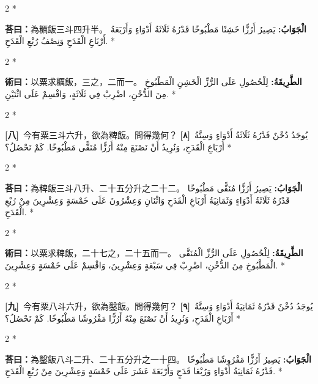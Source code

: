 \documentclass[11pt,a4paper]{article}
\newcommand{\ar}[1]{\arabicfont\beginR #1\endR}
\newcommand{\problemnum}[1]{\textbf{[\ignorespaces#1\unskip]}}
\newenvironment{bilingual}{%
  \begin{paracol}{2}%
  \switchcolumn[0]*%
}{%
  \end{paracol}%
}
\newcommand{\cnline}[1]{\switchcolumn[0]\noindent #1 \switchcolumn[1]}
\newcommand{\arline}[1]{\noindent\ar{#1} \switchcolumn[0]*}
\newenvironment{prob bilingual}{%
  \begin{paracol}{2}%
  \switchcolumn[0]*%
}{%
  \end{paracol}%
  \vspace{0.3em}%
}
\begin{document}
\begin{bilingual}
\cnline{\textcolor{answercolor}{\textbf{荅曰：}}為糲飯三斗四升半。}
\arline{\textcolor{answercolor}{\textbf{الْجَوَابُ:}} يَصِيرُ أَرُزًّا خَشِنًا مَطْبُوخًا قَدْرُهُ ثَلَاثَةُ أَدْوَاءٍ وَأَرْبَعَةُ أَرْبَاعِ الْقَدَحِ وَنِصْفُ رُبْعِ الْقَدَحِ.}
\end{bilingual}

\begin{bilingual}
\cnline{%
\textcolor{methodcolor}{\textbf{術曰：}}以粟求糲飯，三之，二而一。
}
\arline{%
\textcolor{methodcolor}{\textbf{الطَّرِيقَةُ:}} لِلْحُصُولِ عَلَى الرُّزِّ الْخَشِنِ الْمَطْبُوخِ مِنَ الدُّخْنِ، اضْرِبْ فِي ثَلَاثَةٍ، وَاقْسِمْ عَلَى اثْنَيْنِ.
}
\end{bilingual}

\begin{bilingual}
\cnline{\problemnum{八}\, 今有粟三斗六升，欲為粺飯。問得幾何？}
\arline{\problemnum{٨}\, يُوجَدُ دُخْنٌ قَدْرُهُ ثَلَاثَةُ أَدْوَاءٍ وَسِتَّةُ أَرْبَاعِ الْقَدَحِ، وَنُرِيدُ أَنْ نَصْنَعَ مِنْهُ أَرُزًّا مُنَقًّى مَطْبُوخًا. كَمْ نَحْصُلُ؟}
\end{bilingual}

\begin{bilingual}
\cnline{\textcolor{answercolor}{\textbf{荅曰：}}為粺飯三斗八升、二十五分升之二十二。}
\arline{\textcolor{answercolor}{\textbf{الْجَوَابُ:}} يَصِيرُ أَرُزًّا مُنَقًّى مَطْبُوخًا قَدْرُهُ ثَلَاثَةُ أَدْوَاءٍ وَثَمَانِيَةُ أَرْبَاعِ الْقَدَحِ وَاثْنَانِ وَعِشْرُونَ عَلَى خَمْسَةٍ وَعِشْرِينَ مِنْ رُبْعِ الْقَدَحِ.}
\end{bilingual}

\begin{bilingual}
\cnline{%
\textcolor{methodcolor}{\textbf{術曰：}}以粟求粺飯，二十七之，二十五而一。
}
\arline{%
\textcolor{methodcolor}{\textbf{الطَّرِيقَةُ:}} لِلْحُصُولِ عَلَى الرُّزِّ الْمُنَقَّى الْمَطْبُوخِ مِنَ الدُّخْنِ، اضْرِبْ فِي سَبْعَةٍ وَعِشْرِينَ، وَاقْسِمْ عَلَى خَمْسَةٍ وَعِشْرِينَ.
}
\end{bilingual}

\begin{bilingual}
\cnline{\problemnum{九}\, 今有粟八斗六升，欲為鑿飯。問得幾何？}
\arline{\problemnum{٩}\, يُوجَدُ دُخْنٌ قَدْرُهُ ثَمَانِيَةُ أَدْوَاءٍ وَسِتَّةُ أَرْبَاعِ الْقَدَحِ، وَنُرِيدُ أَنْ نَصْنَعَ مِنْهُ أَرُزًّا مَفْرُوشًا مَطْبُوخًا. كَمْ نَحْصُلُ؟}
\end{bilingual}

\begin{bilingual}
\cnline{\textcolor{answercolor}{\textbf{荅曰：}}為鑿飯八斗二升、二十五分升之一十四。}
\arline{\textcolor{answercolor}{\textbf{الْجَوَابُ:}} يَصِيرُ أَرُزًّا مَفْرُوشًا مَطْبُوخًا قَدْرُهُ ثَمَانِيَةُ أَدْوَاءٍ وَرُبْعَا قَدَحٍ وَأَرْبَعَةَ عَشَرَ عَلَى خَمْسَةٍ وَعِشْرِينَ مِنْ رُبْعِ الْقَدَحِ.}
\end{bilingual}
\end{document}
